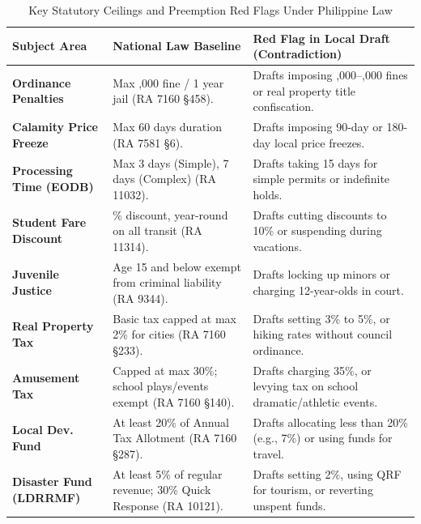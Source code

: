 \begin{table}[htbp]
    \centering
    \footnotesize
    \setlength{\tabcolsep}{3.5pt}
    \renewcommand{\arraystretch}{0.92}
    \caption[Key Statutory Ceilings and Preemption Thresholds]{Key Statutory Ceilings and Preemption Red Flags Under Philippine Law}
    \label{tab:app_guide_ceilings}
    \begin{tabularx}{\linewidth}{>{\bfseries}p{2.6cm}>{\RaggedRight\arraybackslash}p{4.2cm}>{\RaggedRight\arraybackslash}X}
        \toprule
        \textbf{Subject Area} & \textbf{National Law Baseline} & \textbf{Red Flag in Local Draft (Contradiction)} \\
        \midrule
        Ordinance Penalties & Max \textpeso 5,000 fine / 1 year jail (RA 7160 \S458). & Drafts imposing \textpeso 10,000--\textpeso 25,000 fines or real property title confiscation. \\
        \addlinespace[2pt]
        Calamity Price Freeze & Max 60 days duration (RA 7581 \S6). & Drafts imposing 90-day or 180-day local price freezes. \\
        \addlinespace[2pt]
        Processing Time (EODB) & Max 3 days (Simple), 7 days (Complex) (RA 11032). & Drafts taking 15 days for simple permits or indefinite holds. \\
        \addlinespace[2pt]
        Student Fare Discount & 20\% discount, year-round on all transit (RA 11314). & Drafts cutting discounts to 10\% or suspending during vacations. \\
        \addlinespace[2pt]
        Juvenile Justice & Age 15 and below exempt from criminal liability (RA 9344). & Drafts locking up minors or charging 12-year-olds in court. \\
        \addlinespace[2pt]
        Real Property Tax & Basic tax capped at max 2\% for cities (RA 7160 \S233). & Drafts setting 3\% to 5\%, or hiking rates without council ordinance. \\
        \addlinespace[2pt]
        Amusement Tax & Capped at max 30\%; school plays/events exempt (RA 7160 \S140). & Drafts charging 35\%, or levying tax on school dramatic/athletic events. \\
        \addlinespace[2pt]
        Local Dev. Fund & At least 20\% of Annual Tax Allotment (RA 7160 \S287). & Drafts allocating less than 20\% (e.g., 7\%) or using funds for travel. \\
        \addlinespace[2pt]
        Disaster Fund (LDRRMF) & At least 5\% of regular revenue; 30\% Quick Response (RA 10121). & Drafts setting 2\%, using QRF for tourism, or reverting unspent funds. \\
        \bottomrule
    \end{tabularx}
\end{table}

